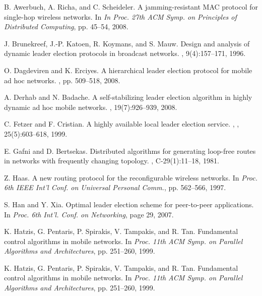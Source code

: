 \begin{thebibliography}{1}
	
	B. Awerbuch, A. Richa, and C. Scheideler.
	\newblock A jamming-resistant MAC protocol for single-hop wireless networks.
	\newblock In {\em In Proc. 27th ACM Symp. on Principles of Distributed Computing}, pp. 45–54, 2008.
	
	
	J. Brunekreef, J.-P. Katoen, R. Koymans, and S. Mauw.
	\newblock Design and analysis of dynamic leader election protocols in broadcast networks.
	, 9(4):157–171, 1996.
	
	O. Dagdeviren and K. Erciyes.
	\newblock A hierarchical leader election protocol for mobile ad hoc networks.
	, pp. 509–518, 2008.
	
	A. Derhab and N. Badache.
	\newblock A self-stabilizing leader election algorithm in highly dynamic ad hoc mobile networks.
	, 19(7):926–939, 2008.
	
	C. Fetzer and F. Cristian.
	\newblock A highly available local leader election service.
	, , 25(5):603–618, 1999.
	
	E. Gafni and D. Bertsekas.
	\newblock Distributed algorithms for generating loop-free routes in networks with frequently changing topology.
	, C-29(1):11–18, 1981.
	
	Z. Haas.
	\newblock  A new routing protocol for the reconfigurable wireless networks.
	\newblock In {\em Proc. 6th IEEE Int’l Conf. on Universal Personal Comm.}, pp. 562–566, 1997.
	
	S. Han and Y. Xia.
	\newblock  Optimal leader election scheme for peer-to-peer applications.
	\newblock In {\em Proc. 6th Int’l. Conf. on Networking}, page 29, 2007.
	
	K. Hatzis, G. Pentaris, P. Spirakis, V. Tampakis, and R. Tan.
	\newblock  Fundamental control algorithms in mobile networks.
	\newblock In {\em Proc. 11th ACM Symp. on Parallel Algorithms and Architectures}, pp. 251–260, 1999.
	
	K. Hatzis, G. Pentaris, P. Spirakis, V. Tampakis, and R. Tan.
	\newblock  Fundamental control algorithms in mobile networks.
	\newblock In {\em Proc. 11th ACM Symp. on Parallel Algorithms and Architectures}, pp. 251–260, 1999.
	

\end{thebibliography}
